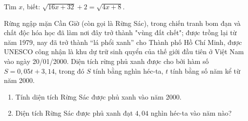\begin{bt}%
	Tìm $ x $, biết: $ \sqrt{16x + 32} + 2 = \sqrt{4x + 8} $.
\end{bt}

\begin{bt}%
	Rừng ngập mặn Cần Giờ (còn gọi là Rừng Sác), trong chiến tranh bom đạn và chất độc hóa học đã làm nơi đây trở thành "vùng đất chết"; được trồng lại từ năm 1979, nay đã trở thành ``lá phổi xanh'' cho Thành phố Hồ Chí Minh, được UNESCO công nhận là khu dự trữ sinh quyển của thế giới đầu tiên ở Việt Nam vào ngày 20/01/2000. Diện tích rừng phủ xanh được cho bởi hàm số $ S = 0{,}05t + 3{,}14 $, trong đó $ S $ tính bằng nghìn héc-ta, $ t $ tính bằng số năm kể từ năm 2000.
	\begin{enumerate}
		\item Tính diện tích Rừng Sác được phủ xanh vào năm 2000.
		\item Diện tích Rừng Sác được phủ xanh đạt $ 4{,}04 $ nghìn héc-ta vào năm nào?
	\end{enumerate}
\end{bt}

